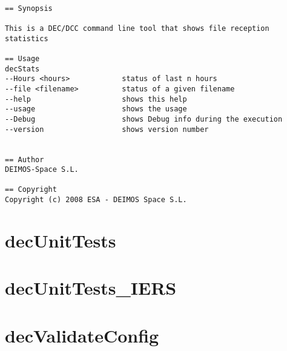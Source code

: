 \documentclass[dec_sum_main.tex]{subfiles}
\begin{document}
\begin{verbatim}

== Synopsis

This is a DEC/DCC command line tool that shows file reception statistics  

== Usage
decStats
--Hours <hours>            status of last n hours
--file <filename>          status of a given filename
--help                     shows this help
--usage                    shows the usage
--Debug                    shows Debug info during the execution
--version                  shows version number


== Author
DEIMOS-Space S.L.

== Copyright
Copyright (c) 2008 ESA - DEIMOS Space S.L.

\end{verbatim}

\section{decUnitTests}

\section{decUnitTests\_IERS}

\section{decValidateConfig}
\end{document}
